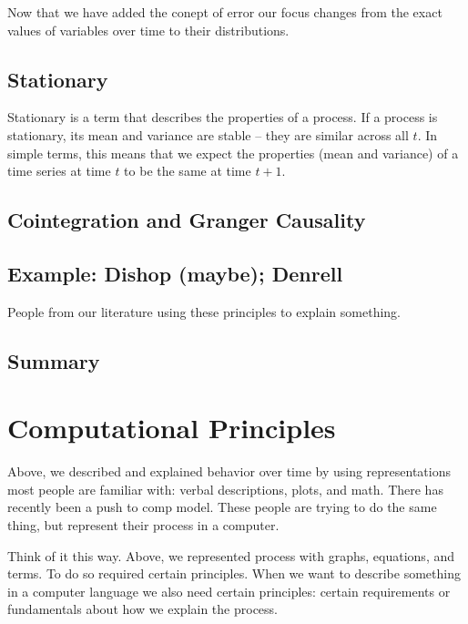 \documentclass[english,,man]{apa6}
\theoremstyle{definition}
\theoremstyle{definition}
\theoremstyle{definition}
\theoremstyle{remark}
\begin{document}
Now that we have added the conept of error our focus changes from the
exact values of variables over time to their distributions.

\hypertarget{stationary}{%
\subsection{Stationary}\label{stationary}}

Stationary is a term that describes the properties of a process. If a
process is stationary, its mean and variance are stable -- they are
similar across all \(t\). In simple terms, this means that we expect the
properties (mean and variance) of a time series at time \(t\) to be the
same at time \(t+1\).

\hypertarget{cointegration-and-granger-causality}{%
\subsection{Cointegration and Granger
Causality}\label{cointegration-and-granger-causality}}

\hypertarget{example-dishop-maybe-denrell}{%
\subsection{Example: Dishop (maybe);
Denrell}\label{example-dishop-maybe-denrell}}

People from our literature using these principles to explain something.

\hypertarget{summary-1}{%
\subsection{Summary}\label{summary-1}}

\hypertarget{computational-principles}{%
\section{Computational Principles}\label{computational-principles}}

Above, we described and explained behavior over time by using
representations most people are familiar with: verbal descriptions,
plots, and math. There has recently been a push to comp model. These
people are trying to do the same thing, but represent their process in a
computer.

Think of it this way. Above, we represented process with graphs,
equations, and terms. To do so required certain principles. When we want
to describe something in a computer language we also need certain
principles: certain requirements or fundamentals about how we explain
the process.
\end{document}
